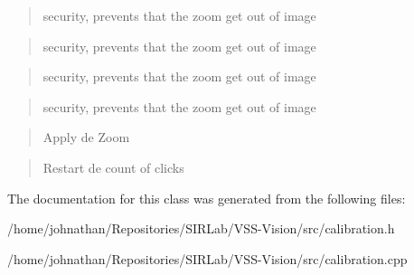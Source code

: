 \begin{quote}
security, prevents that the zoom get out of image \end{quote}


\begin{quote}
security, prevents that the zoom get out of image \end{quote}


\begin{quote}
security, prevents that the zoom get out of image \end{quote}


\begin{quote}
security, prevents that the zoom get out of image \end{quote}


\begin{quote}
Apply de Zoom \end{quote}


\begin{quote}
Restart de count of clicks \end{quote}


The documentation for this class was generated from the following files\+:\begin{DoxyCompactItemize}
\item 
/home/johnathan/\+Repositories/\+S\+I\+R\+Lab/\+V\+S\+S-\/\+Vision/src/calibration.\+h\item 
/home/johnathan/\+Repositories/\+S\+I\+R\+Lab/\+V\+S\+S-\/\+Vision/src/calibration.\+cpp\end{DoxyCompactItemize}
